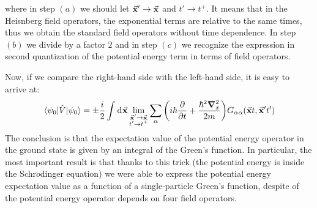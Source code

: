 \documentclass[../main/main.tex]{subfiles}
\begin{document}
where in step \( (a) \) we should let \( \va{x}' \rightarrow \va{x} \) and \( t' \rightarrow t^+ \). It means that in the Heisnberg field operators, the exponential terms are relative to the same times, thus we obtain the standard field operators without time dependence.
In step \( (b) \) we divide by a factor \( 2 \) and in step \( (c) \) we recognize the expression in second quantization of the potential energy term in terms of field operators.


Now, if we compare the right-hand side with the left-hand side, it is easy to arrive at: 
\begin{equation*}
\expval{\hat{V} }{\psi_0} = \pm \frac{i}{2}
\int_{}^{} \dd[]{\va{x}}
\lim_{\substack{\va{x}' \rightarrow \va{x} \\t' \rightarrow t^+ } }
\sum_{\alpha }^{}
\qty(i \hbar \pdv{}{t} + \frac{\hbar ^2 \grad _x^2}{2m} )
G_{\alpha \alpha }(\va{x}t,\va{x}'t')
\end{equation*}
The conclusion is that the expectation value of the potential energy operator in the ground state is given by an integral of the Green's function. In particular, the most important result is that thanks to this trick (the potential energy is inside the Schr$\ddot{o}$dinger equation) we were able to express the potential energy expectation value as a function of a single-particle Green's function, despite of the potential energy operator depends on four field operators.
\end{document}
